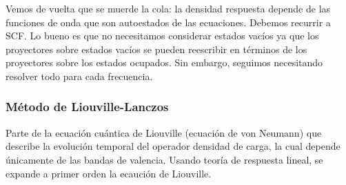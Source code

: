   Vemos de vuelta que se muerde la cola: la densidad respuesta depende de las funciones de onda que son autoestados de las ecuaciones. Debemos recurrir a SCF. Lo bueno es que no necesitamos considerar estados vacíos ya que los proyectores sobre estados vacíos se pueden reescribir en términos de los proyectores sobre los estados ocupados. Sin embargo, seguimos necesitando resolver todo para cada frecuencia.


\subsubsection{Método de Liouville-Lanczos}

  Parte de la ecuación cuántica de Liouville (ecuación de von Neumann) que describe la evolución temporal del operador densidad de carga, la cual depende únicamente de las bandas de valencia. Usando teoría de respuesta lineal, se expande a primer orden la ecaución de Liouville.
    \begin{figure}[H]
        \centering
         \\
    \end{figure}


